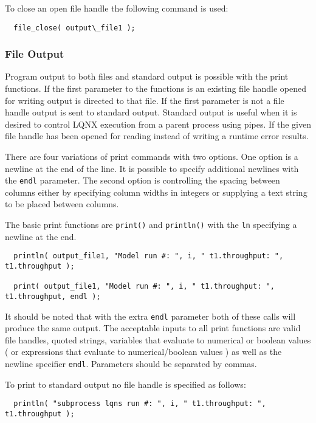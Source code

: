 To close an open file handle the following command is used:

\lstset{language=LQX}
\begin{lstlisting}
  file_close( output\_file1 );
\end{lstlisting}

\subsubsection{File Output}

Program output to both files and standard output is possible with the print functions. If the first parameter to
the functions is an existing file handle opened for writing output is directed to that file. If the first parameter
is not a file handle output is sent to standard output. Standard output is useful when it is desired to control LQNX
execution from a parent process using pipes. If the given file handle has been opened for reading instead of writing
a runtime error results.

There are four variations of print commands with two options. One option is a newline at the end of the line. It is
possible to specify additional newlines with the {\tt endl} parameter. The second option is controlling the spacing
between columns either by specifying column widths in integers or supplying a text string to be placed between columns.

The basic print functions are {\tt print()} and {\tt println()} with the {\tt ln} specifying a newline at the end.

\lstset{language=LQX}
\begin{lstlisting}
  println( output_file1, "Model run #: ", i, " t1.throughput: ", t1.throughput );

  print( output_file1, "Model run #: ", i, " t1.throughput: ", t1.throughput, endl );
\end{lstlisting}

It should be noted that with the extra {\tt endl} parameter both of these calls will produce the same output.
The acceptable inputs to all print functions are valid file handles, quoted strings, \ModLang variables that
evaluate to numerical or boolean values ( or expressions that evaluate to numerical/boolean values ) as well 
as the newline specifier {\tt endl}. Parameters should be separated by commas.

To print to standard output no file handle is specified as follows:

\lstset{language=LQX}
\begin{lstlisting}
  println( "subprocess lqns run #: ", i, " t1.throughput: ", t1.throughput );
\end{lstlisting}

